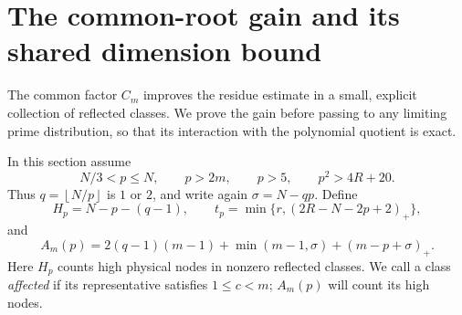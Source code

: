 \documentclass[11pt,letterpaper]{article}
\theoremstyle{definition}
\newcommand{\pos}[1]{\left(#1\right)_{+}}
\newcommand{\floor}[1]{\left\lfloor #1\right\rfloor}
\begin{document}

\section{The common-root gain and its shared dimension bound}\label{sec:root-gain}

The common factor $C_m$ improves the residue estimate in a small,
explicit collection of reflected classes. We prove the gain before
passing to any limiting prime distribution, so that its interaction
with the polynomial quotient is exact.

In this section assume
\begin{equation}\label{eq:root-gain-range}
 N/3<p\le N,\qquad p>2m,\qquad p>5,\qquad p^2>4R+20.
\end{equation}
Thus $q=\floor{N/p}$ is $1$ or $2$, and write again
$\sigma=N-qp$. Define
\begin{equation}\label{eq:high-node-count}
 H_p=N-p-(q-1),\qquad
 t_p=\min\{r,\pos{2R-N-2p+2}\},
\end{equation}
and
\begin{equation}\label{eq:affected-node-count}
 A_m(p)=2(q-1)(m-1)+\min(m-1,\sigma)+\pos{m-p+\sigma}.
\end{equation}
Here $H_p$ counts high physical nodes in nonzero reflected classes.
We call a class \emph{affected} if its representative satisfies
$1\le c<m$; $A_m(p)$ will count its high nodes.
\end{document}
